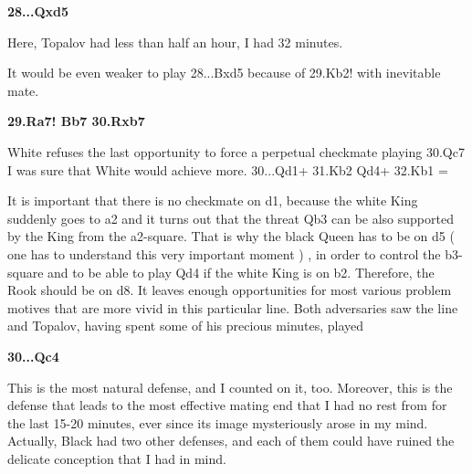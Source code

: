 \documentclass[
	11pt,twocolumn]{article}
\renewcommand{\bf}{\bfseries}
\begin{document}
{\bf 28...Qxd5 }

Here, Topalov had less than half an hour, I had 32 minutes.



It would be even weaker to play 28...Bxd5  because of 29.Kb2! with inevitable mate. 

{\bf 29.Ra7! Bb7 30.Rxb7 }

White refuses the last opportunity to force a perpetual checkmate playing 30.Qc7  I was sure that White would achieve more. 30...Qd1+ 31.Kb2 Qd4+ 32.Kb1 =



It is important that there is no checkmate on d1, because the white King suddenly goes to a2 and it turns out that the threat Qb3 can be also supported by the King from the a2-square. That is why the black Queen has to be on d5 ( one has to understand this very important moment ) , in order to control the b3-square and to be able to play Qd4 if the white King is on b2. Therefore, the Rook should be on d8. It leaves enough opportunities for most various problem motives that are more vivid in this particular line. Both adversaries saw the line and Topalov, having spent some of his precious minutes, played

{\bf 30...Qc4 }

This is the most natural defense, and I counted on it, too. Moreover, this is the defense that leads to the most effective mating end that I had no rest from for the last 15-20 minutes, ever since its image mysteriously arose in my mind. Actually, Black had two other defenses, and each of them could have ruined the delicate conception that I had in mind.
\end{document}
